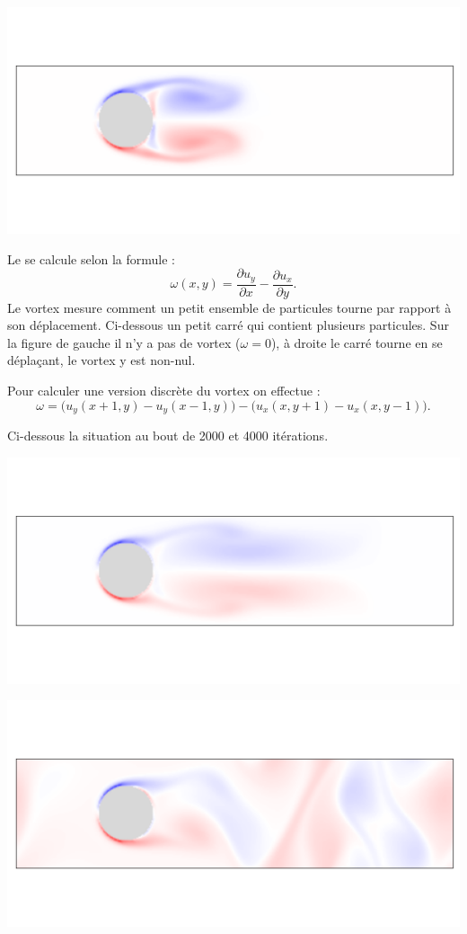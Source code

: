 \documentclass[11pt,class=report,crop=false]{standalone}
\begin{document}
\begin{center}	
	\includegraphics[scale=\myscale,scale=0.5,trim={0 3cm 0 3cm},clip]{figures/fluide-vortex-1000}			
\end{center}

Le  se calcule selon la formule :
$$\omega(x,y) = \frac{\partial u_y}{\partial x} -\frac{\partial u_x}{\partial y}.$$
Le vortex mesure comment un petit ensemble de particules
tourne par rapport à son déplacement. Ci-dessous un petit carré qui contient plusieurs particules. Sur la figure de gauche il n'y a pas de vortex ($\omega=0$), à droite le carré tourne en se déplaçant, le vortex y est non-nul.


Pour calculer une version discrète du vortex on effectue :
$$\omega = \big( u_y(x+1,y) - u_y(x-1,y) \big) - \big( u_x(x,y+1) - u_x(x,y-1) \big).$$


Ci-dessous la situation au bout de 2000 et 4000 itérations.
\begin{center}	
	\includegraphics[scale=\myscale,scale=0.5,trim={0 3cm 0 3cm},clip]{figures/fluide-vortex-2000}			

	\includegraphics[scale=\myscale,scale=0.5,trim={0 3cm 0 3cm},clip]{figures/fluide-vortex-4000}			
\end{center}
\end{document}
